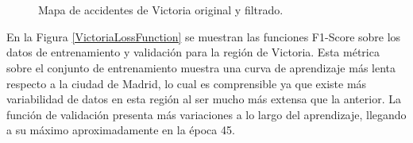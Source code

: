 \documentclass{uathesis-es}
\begin{document}
{		
		\begin{figure}[H]
			\centering
			\\
			\\
			\caption{Mapa de accidentes de Victoria original y filtrado.}
			\label{VictoriaAccidentsMap}
		\end{figure}
		
		
		En la Figura \ref{VictoriaLossFunction} se muestran las funciones F1-Score sobre los datos de entrenamiento y validación para la región de Victoria. Esta métrica sobre el conjunto de entrenamiento muestra una curva de aprendizaje más lenta respecto a la ciudad de Madrid, lo cual es comprensible ya que existe más variabilidad de datos en esta región al ser mucho más extensa que la anterior. La función de validación presenta más variaciones a lo largo del aprendizaje, llegando a su máximo aproximadamente en la época 45.
		
}
\end{document}
